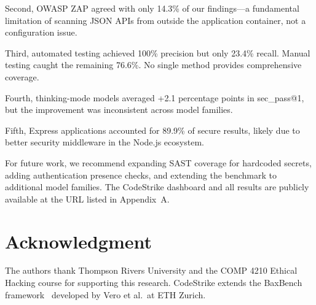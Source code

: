 \documentclass[conference,a4paper]{IEEEtran}
\begin{document}
Second, OWASP ZAP agreed with only 14.3\% of our findings---a fundamental limitation of scanning JSON APIs from outside the application container, not a configuration issue.

Third, automated testing achieved 100\% precision but only 23.4\% recall. Manual testing caught the remaining 76.6\%. No single method provides comprehensive coverage.

Fourth, thinking-mode models averaged +2.1 percentage points in sec\_pass@1, but the improvement was inconsistent across model families.

Fifth, Express applications accounted for 89.9\% of secure results, likely due to better security middleware in the Node.js ecosystem.

For future work, we recommend expanding SAST coverage for hardcoded secrets, adding authentication presence checks, and extending the benchmark to additional model families. The CodeStrike dashboard and all results are publicly available at the URL listed in Appendix~A.

\section*{Acknowledgment}
The authors thank Thompson Rivers University and the COMP 4210 Ethical Hacking course for supporting this research. CodeStrike extends the BaxBench framework~\cite{vero2025} developed by Vero et al.\ at ETH Zurich.
\end{document}
